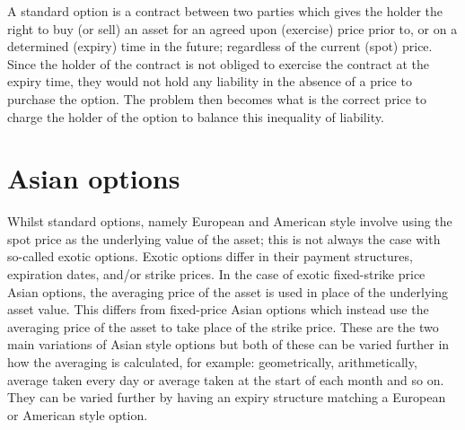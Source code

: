 A standard option is a contract between two parties which gives the holder the right to buy (or sell) an asset for an agreed upon (exercise) price prior to, or on a determined (expiry) time in the future; regardless of the current (spot) price. Since the holder of the contract is not obliged to exercise the contract at the expiry time, they would not hold any liability in the absence of a price to purchase the option. The problem then becomes what is the correct price to charge the holder of the option to balance this inequality of liability. 

\section{Asian options}

Whilst standard options, namely European and American style involve using the spot price as the underlying value of the asset; this is not always the case with so-called exotic options. Exotic options differ in their payment structures, expiration dates, and/or strike prices. In the case of exotic fixed-strike price Asian options, the averaging price of the asset is used in place of the underlying asset value. This differs from fixed-price Asian options which instead use the averaging price of the asset to take place of the strike price. These are the two main variations of Asian style options but both of these can be varied further in how the averaging is calculated, for example: geometrically, arithmetically, average taken every day or average taken at the start of each month and so on. They can be varied further by having an expiry structure matching a European or American style option.